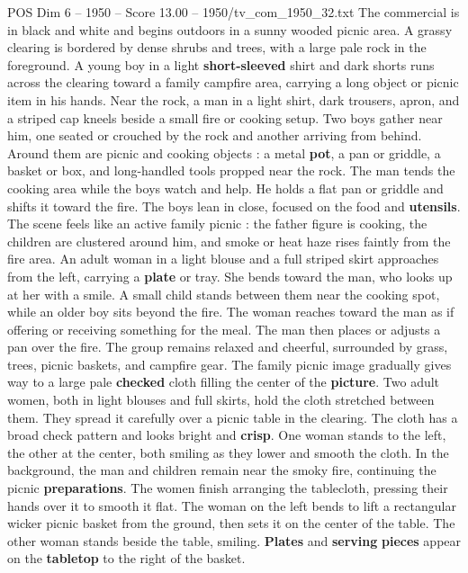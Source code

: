 \begin{textsample}{POS Dim 6 – 1950 – Score 13.00 – 1950/tv\_com\_1950\_32.txt}  \label{ex:f6_pos_013}
The commercial is in black and white and begins outdoors in a sunny wooded picnic area.
A grassy clearing is bordered by dense shrubs and trees, with a large pale rock in the foreground.
A young boy in a light \textbf{short-sleeved} shirt and dark shorts runs across the clearing toward a family campfire area, carrying a long object or picnic item in his hands.
Near the rock, a man in a light shirt, dark trousers, apron, and a striped cap kneels beside a small fire or cooking setup.
Two boys gather near him, one seated or crouched by the rock and another arriving from behind.
Around them are picnic and cooking objects : a metal \textbf{pot}, a pan or griddle, a basket or box, and long-handled tools propped near the rock.
The man tends the cooking area while the boys watch and help.
He holds a flat pan or griddle and shifts it toward the fire.
The boys lean in close, focused on the food and \textbf{utensils}.
The scene feels like an active family picnic : the father figure is cooking, the children are clustered around him, and smoke or heat haze rises faintly from the fire area.
An adult woman in a light blouse and a full striped skirt approaches from the left, carrying a \textbf{plate} or tray.
She bends toward the man, who looks up at her with a smile.
A small child stands between them near the cooking spot, while an older boy sits beyond the fire.
The woman reaches toward the man as if offering or receiving something for the meal.
The man then places or adjusts a pan over the fire.
The group remains relaxed and cheerful, surrounded by grass, trees, picnic baskets, and campfire gear.
The family picnic image gradually gives way to a large pale \textbf{checked} cloth filling the center of the \textbf{picture}.
Two adult women, both in light blouses and full skirts, hold the cloth stretched between them.
They spread it carefully over a picnic table in the clearing.
The cloth has a broad check pattern and looks bright and \textbf{crisp}.
One woman stands to the left, the other at the center, both smiling as they lower and smooth the cloth.
In the background, the man and children remain near the smoky fire, continuing the picnic \textbf{preparations}.
The women finish arranging the tablecloth, pressing their hands over it to smooth it flat.
The woman on the left bends to lift a rectangular wicker picnic basket from the ground, then sets it on the center of the table.
The other woman stands beside the table, smiling. \textbf{Plates} and \textbf{serving} \textbf{pieces} appear on the \textbf{tabletop} to the right of the basket.

\end{textsample}
